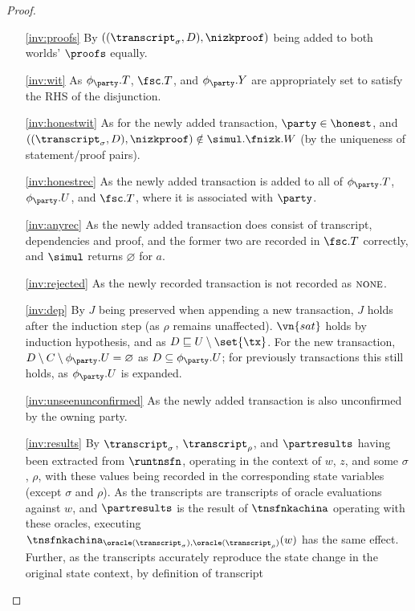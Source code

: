 \begin{proof}
\begin{enumerate}
  \item[\ref{inv:proofs}] By $((\transcript_\sigma, D), \nizkproof)$ being
    added to both worlds' $\proofs$ equally.
  \item[\ref{inv:wit}] As $\phi_\party.T$, $\fsc.T$, and
    $\phi_\party.Y$ are appropriately set to satisfy the RHS of the disjunction.
  \item[\ref{inv:honestwit}] As for the newly added transaction, $\party \in
    \honest$, and $((\transcript_\sigma, D),\allowbreak \nizkproof) \notin
    \simul.\fnizk.W$ (by the uniqueness of statement/proof pairs).
  \item[\ref{inv:honestrec}] As the newly added transaction is added to all of
    $\phi_\party.T$, $\phi_\party.U$, and $\fsc.T$, where it is
    associated with $\party$.
  \item[\ref{inv:anyrec}] As the newly added transaction does consist of
    transcript, dependencies and proof, and the former two are recorded in
    $\fsc.T$ correctly, and $\simul$ returns $\varnothing$ for
    $a$.
  \item[\ref{inv:rejected}] As the newly recorded transaction is not recorded
    as $\textsc{none}$.
  \item[\ref{inv:dep}] By $J$ being preserved when appending a new
    transaction, $J$ holds after the induction step (as $\rho$ remains unaffected).
    $\vn{sat}$ holds by induction hypothesis, and as $D \sqsubseteq U
    \setminus \set{\tx}$. For the new transaction, $D \setminus C \setminus \phi_\party.U =
    \varnothing$ as $D \subseteq \phi_\party.U$; for previously transactions this still
    holds, as $\phi_\party.U$ is expanded.
  \item[\ref{inv:unseenunconfirmed}] As the newly added transaction is also
    unconfirmed by the owning party.
  \item[\ref{inv:results}] By $\transcript_\sigma$, $\transcript_\rho$, and $\partresults$
    having been extracted from $\runtnsfn$, operating in the context of $w$,
    $z$, and some $\sigma$, $\rho$, with these values being recorded in the
    corresponding state variables (except $\sigma$ and $\rho$). As the
    transcripts are transcripts of oracle evaluations against $w$, and $\partresults$ is
    the result of $\tnsfnkachina$ operating with these oracles, executing
    $\tnsfnkachina_{\oracle(\transcript_\sigma), \oracle(\transcript_\rho)}(w)$ has
    the same effect. Further, as the transcripts accurately reproduce the state
    change in the original state context, by definition of transcript

\end{enumerate}
\end{proof}
